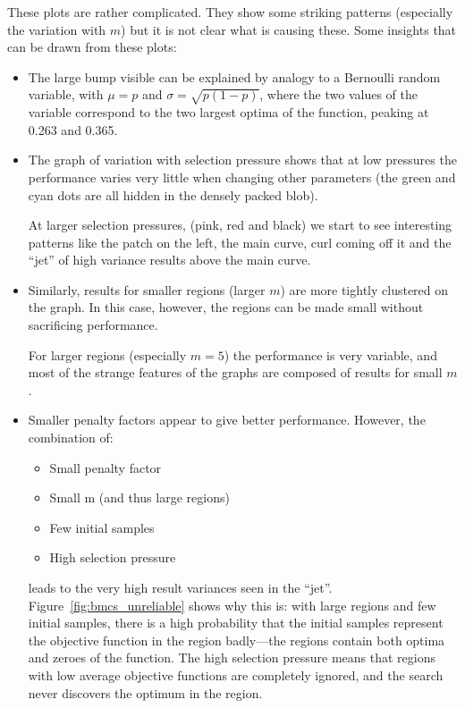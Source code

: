 \documentclass[10pt]{article}
\begin{document}
These plots are rather complicated. They show some striking patterns
(especially the variation with $m$) but it is not clear what is causing these.
Some insights that can be drawn from these plots:

\begin{itemize}
  \item 
    The large bump visible can be explained by analogy to a Bernoulli random
    variable, with $\mu = p$ and $\sigma = \sqrt{p(1-p)}$, where the two values of
    the variable correspond to the two largest optima of the function, peaking at
    0.263 and 0.365.

  \item
    The graph of variation with selection pressure shows that at low pressures
    the performance varies very little when changing other parameters (the
    green and cyan dots are all hidden in the densely packed blob).
    
    At larger selection pressures, (pink, red and black) we start to see
    interesting patterns like the patch on the left, the main curve, curl
    coming off it and the ``jet'' of high variance results above the main
    curve.

  \item
    Similarly, results for smaller regions (larger $m$) are more tightly
    clustered on the graph. In this case, however, the regions can be made
    small without sacrificing performance.

    For larger regions (especially $m = 5$) the performance is very variable,
    and most of the strange features of the graphs are composed of results for
    small $m$.

  \item
    Smaller penalty factors appear to give better performance. However,
    the combination of:
    \begin{itemize}
      \item Small penalty factor
      \item Small m (and thus large regions)
      \item Few initial samples
      \item High selection pressure
    \end{itemize}
    leads to the very high result variances seen in the ``jet''.
    Figure~\ref{fig:bmcs_unreliable} shows why this is: with large regions and
    few initial samples, there is a high probability that the initial samples
    represent the objective function in the region badly---the regions
    contain both optima and zeroes of the function. The high selection
    pressure means that regions with low average objective functions are
    completely ignored, and the search never discovers the optimum in the
    region.


\end{itemize}
\end{document}
